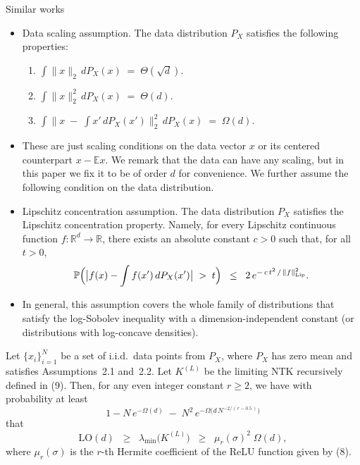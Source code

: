 \documentclass[serif, aspectratio=169]{beamer}
\begin{document}
\begin{frame}{Similar works}
	\begin{itemize}
		\item Data scaling assumption.
		The data distribution $P_X$ satisfies the following properties:
		\begin{enumerate}
			\item $\displaystyle \int \|x\|_{2}\, dP_X(x) \;=\; \Theta(\sqrt{d}).$
			\item $\displaystyle \int \|x\|_{2}^{2}\, dP_X(x) \;=\; \Theta(d).$
			\item $\displaystyle \int \bigl\|x \;-\; \int x' \, dP_X(x')\bigr\|_{2}^{2}\, dP_X(x) 
			\;=\; \Omega(d).$
		\end{enumerate}
		\item These are just scaling conditions on the data vector $x$ or its centered 
		counterpart $x - \mathbb{E}x$. We remark that the data can have any scaling, 
		but in this paper we fix it to be of order $d$ for convenience. We further 
		assume the following condition on the data distribution.
		
		
	\end{itemize}
\end{frame}

\begin{frame}
	\begin{itemize}
		\item Lipschitz concentration assumption.
		The data distribution $P_X$ satisfies the Lipschitz concentration property. 
		Namely, for every Lipschitz continuous function 
		$f : \mathbb{R}^d \to \mathbb{R}$, there exists an absolute constant $c > 0$ 
		such that, for all $t > 0$,
		\[
		\mathbb{P}\Bigl(\bigl|f(x) - \int f(x')\,dP_X(x')\bigr| \;>\; t\Bigr)
		\;\;\le\;\; 2\,e^{-\,c\,t^2\,/\,\|f\|_{\mathrm{Lip}}^2}.
		\]
		\item In general, this assumption covers the whole family of distributions that satisfy 
		the log-Sobolev inequality with a dimension-independent constant (or distributions
		with log-concave densities).
	\end{itemize}
\end{frame}


\begin{frame}
	\begin{theorem}
		\label{thm:smallest-eig-NTK}
		Let $\{x_i\}_{i=1}^N$ be a set of i.i.d.\ data points from $P_X$, where $P_X$ has 
		zero mean and satisfies Assumptions~2.1 and~2.2. Let $K^{(L)}$ be the limiting 
		NTK recursively defined in (9). Then, for any even integer constant $r \ge 2$, 
		we have with probability at least 
		\[
		1 - N\,e^{-\Omega(d)} \;-\; N^2\,e^{-\Omega\bigl(d\,N^{-2/(\,r - 0.5\,)}\bigr)}
		\]
		that
		\[
		\mathrm{LO}(d) 
		\;\;\ge\;\;
		\lambda_{\min}\bigl(K^{(L)}\bigr) 
		\;\;\ge\;\;
		\mu_{r}(\sigma)^{2}\;\Omega(d),
		\]
		where $\mu_{r}(\sigma)$ is the $r$-th Hermite coefficient of the ReLU function 
		given by (8).
	\end{theorem}
\end{frame}
\end{document}
